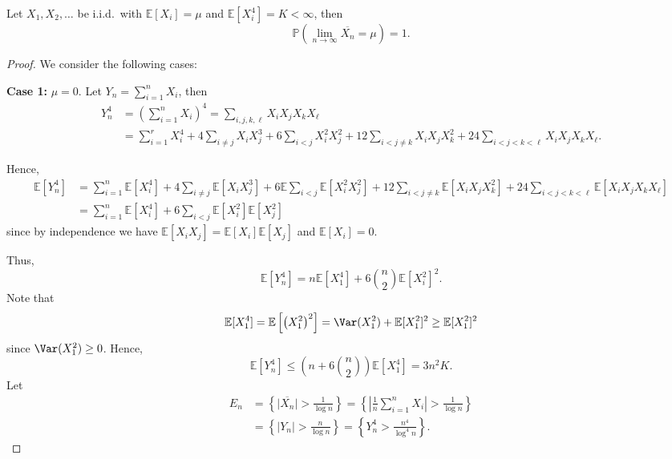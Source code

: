 \begin{theorem}
    Let \(X_1, X_2, \dots \) be i.i.d.\ with \(\mathbb{E} [X_i] = \mu\) and \(\mathbb{E} [X_i^4] = K < \infty\), then 
    \[
        \mathbb{P} \left( \lim_{n \to \infty} \overline{X_n} = \mu \right) = 1. 
    \]   
\end{theorem}

\begin{proof}
    We consider the following cases:

    \textbf{Case 1:} \(\mu = 0\). Let \(Y_n = \sum_{i=1}^n X_i \), then 
    \begin{align*}
        Y_n^4 &= \left( \sum_{i=1}^n X_i  \right)^4 = \sum_{i, j, k, \ell} X_i X_j X_k X_{\ell } \\
        &= \sum_{i=1}^r X_i^4 + 4 \sum_{i \neq j} X_i X_j^3 + 6 \sum_{i < j} X_i^2 X_j^2 + 12 \sum_{i < j \neq k} X_i X_j X_k^2 + 24 \sum_{i < j < k < \ell} X_i X_j X_k X_{\ell}.
    \end{align*} 

    Hence,
    \begin{align*}
        \mathbb{E} [Y_n^4] &= \sum_{i=1}^n \mathbb{E} [X_i^4] + 4 \sum_{i \neq j} \mathbb{E} [X_i X_j^3] + 6 \mathbb{E} \sum_{i < j} \mathbb{E} [X_i^2 X_j^2] + 12 \sum_{i < j \neq k} \mathbb{E} [X_i X_j X_k^2] + 24 \sum_{i < j < k < \ell} \mathbb{E} [X_i X_j X_k X_{\ell}] \\
        &= \sum_{i=1}^n \mathbb{E} [X_i^4] + 6 \sum_{i < j} \mathbb{E} [X_i^2] \mathbb{E} [X_j^2]       
    \end{align*}
    since by independence we have \(\mathbb{E} [X_i X_j] = \mathbb{E} [X_i] \mathbb{E} [X_j]\) and \(\mathbb{E} [X_i] = 0\).

    Thus,
    \[
        \mathbb{E} [Y_n^4] = n \mathbb{E} [X_1^4] + 6 \binom{n}{2} \mathbb{E} [X_i^2]^2.
    \]   
    Note that 
    \[
        \mathbb{E} [X_1^4] = \mathbb{E} \left[ \left( X_1^2 \right)^2  \right] = \Var(X_1^2) + \mathbb{E} [X_1^2]^2 \ge \mathbb{E} [X_1^2]^2 
    \]
    since \(\Var(X_1^2) \ge 0\). Hence,
    \[
        \mathbb{E} [Y_n^4] \le \left( n + 6 \binom{n}{2} \right) \mathbb{E} [X_1^4] = 3 n^2 K. 
    \] 
    Let
    \begin{align*}
        E_n &= \left\{ \vert \overline{X_n}  \vert > \frac{1}{\log n} \right\} = \left\{ \left\vert \frac{1}{n} \sum_{i=1}^n X_i  \right\vert > \frac{1}{\log n}  \right\} \\
        &= \left\{ \vert Y_n \vert > \frac{n}{\log n}  \right\} = \left\{ Y_n^4 > \frac{n^4}{\log^4 n} \right\}.   
    \end{align*}


\end{proof}
